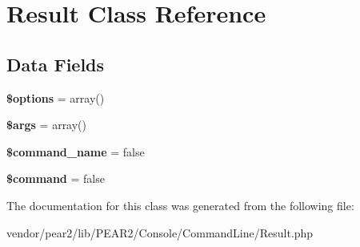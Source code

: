 \hypertarget{class_p_e_a_r2_1_1_console_1_1_command_line_1_1_result}{
\section{\-Result \-Class \-Reference}
\label{class_p_e_a_r2_1_1_console_1_1_command_line_1_1_result}
}
\subsection*{\-Data \-Fields}
\begin{DoxyCompactItemize}
\item 
\hypertarget{class_p_e_a_r2_1_1_console_1_1_command_line_1_1_result_a011800c63ece4cbbfa77136a20607023}{
{\bfseries \$options} = array()}
\label{class_p_e_a_r2_1_1_console_1_1_command_line_1_1_result_a011800c63ece4cbbfa77136a20607023}

\item 
\hypertarget{class_p_e_a_r2_1_1_console_1_1_command_line_1_1_result_a67e94494731d99ed23b123e95175bc10}{
{\bfseries \$args} = array()}
\label{class_p_e_a_r2_1_1_console_1_1_command_line_1_1_result_a67e94494731d99ed23b123e95175bc10}

\item 
\hypertarget{class_p_e_a_r2_1_1_console_1_1_command_line_1_1_result_afe9b5e10f31d1f71aacfa3a27572f0e8}{
{\bfseries \$command\-\_\-name} = false}
\label{class_p_e_a_r2_1_1_console_1_1_command_line_1_1_result_afe9b5e10f31d1f71aacfa3a27572f0e8}

\item 
\hypertarget{class_p_e_a_r2_1_1_console_1_1_command_line_1_1_result_a8f120409eb9f635ac30b3f9a6d5becdc}{
{\bfseries \$command} = false}
\label{class_p_e_a_r2_1_1_console_1_1_command_line_1_1_result_a8f120409eb9f635ac30b3f9a6d5becdc}

\end{DoxyCompactItemize}


\-The documentation for this class was generated from the following file\-:\begin{DoxyCompactItemize}
\item 
vendor/pear2/lib/\-P\-E\-A\-R2/\-Console/\-Command\-Line/\-Result.\-php\end{DoxyCompactItemize}
